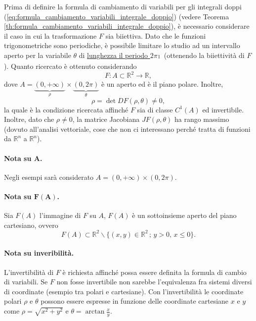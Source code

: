 Prima di definire la formula di cambiamento di variabili per gli integrali doppi (\ref{eq:formula_cambiamento_variabili_integrale_doppio}) (vedere Teorema \ref{th:formula_cambiamento_variabili_integrale_doppio}), è necessario considerare il caso in cui la trasformazione $F$ sia biiettiva. Dato che le funzioni trigonometriche sono periodiche, è possibile limitare lo studio ad un intervallo aperto per la variabile $\theta$ di \ul{lunghezza il periodo $2\pi$}$_{\footnotemark}$ (ottenendo la biiettività di $F$). Quanto ricercato è ottenuto considerando
\begin{equation*}
	F:A\subset\mathbb{R}^2 \rightarrow\mathbb{R},
\end{equation*}
dove $A=\underbrace{(0,+\infty)}_\rho \times \underbrace{(0,2\pi)}_\theta$ è un aperto ed è il piano polare. Inoltre,
\begin{equation*}
	\rho = \det DF(\rho, \theta) \neq 0,
\end{equation*}
la quale è la condizione ricercata affinché $F$ sia di classe $C^1(A)$ ed invertibile. Inoltre, dato che $\rho\neq 0$, la matrice Jacobiana $JF(\rho, \theta)$ ha rango massimo (dovuto all'analisi vettoriale, cose che non ci interessano perché tratta di funzioni da $\mathbb{R}^n$ a $\mathbb{R}^n$).


\paragraph{Nota su $\boldsymbol{A}$.} Negli esempi sarà considerato $A=(0,+\infty) \times(0,2\pi)$.

\paragraph{Nota su $\boldsymbol{F(A)}$.} Sia $F(A)$ l'immagine di $F$ su $A$, $F(A)$ è un sottoinsieme aperto del piano cartesiano, ovvero
\begin{equation*}
	F(A)\subset\mathbb{R}^2\backslash\{(x,y)\in\mathbb{R}^2\,;\, y>0,\, x\leq 0\}.
\end{equation*}

\paragraph{Nota su inveribilità.} L'invertibilità di $F$ è richiesta affinché possa essere definita la formula di cambio di variabili. Se $F$ non fosse invertibile non sarebbe l'equivalenza fra sistemi diversi di coordinate (esempio tra polari e cartesiane). Con l'invertibilità le coordinate polari $\rho$ e $\theta$ possono essere espresse in funzione delle coordinate cartesiane $x$ e $y$ come $\rho = \sqrt{x^2 + y^2}$ e $\theta = \arctan\frac{x}{y}$.

